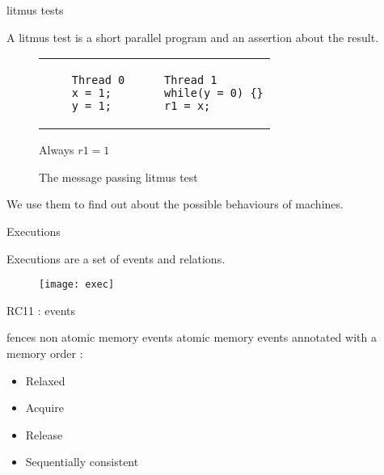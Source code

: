 \documentclass[dvipsnames,svgnames,beamer, 12pt]{beamer}
\begin{document}
\iffalse
\begin{frame}{Restoring ordering}

	Fences : instructions that ensure events before the fence occur before those after the fence.
	\vfill
	Data dependencies : when an instruction A uses the value of an instruction B for some calculation.
	\vfill
	In such a situation processors will ensure B occurs before A.

\end{frame}\fi

\begin{frame}[fragile]{litmus tests}

	\vfill
	\vfill
	A litmus test is a short parallel program and an assertion about the result.
	\begin{figure}
	\centering
	\begin{tabular}{p{4cm} p{4cm}}
	\begin{verbatim}
	Thread 0
	x = 1;
	y = 1;
	\end{verbatim} &
	\begin{verbatim}
	Thread 1
	while(y = 0) {}
	r1 = x;
	\end{verbatim}
	\end{tabular}
	\centerline{Always $r1 = 1$}
	\caption{The message passing litmus test}
	\end{figure}
	\vfill
	We use them to find out about the possible behaviours of machines.
	\vfill
	\vfill

\end{frame}

\begin{frame}{Executions}

	Executions are a set of events and relations.
	\begin{figure}[b]
	\centering
	\texttt{[image: exec]}
	\end{figure}

\end{frame}

\begin{frame}{RC11 : events}

	\vfill
	fences
	\vfill
	non atomic memory events
	\vfill
	atomic memory events annotated with a memory order : \begin{itemize}
	\item Relaxed
	\item Acquire
	\item Release
	\item Sequentially consistent
	\end{itemize}
	\vfill

\end{frame}
\end{document}
